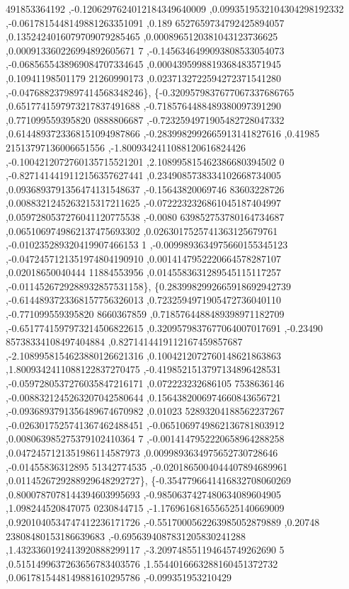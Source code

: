 \begin{DoxyCode}
      491853364192 ,-0.1206297624012184349640009 ,0.0993519532104304298192332 ,-0.0617815448149881263351091 ,0.189
      6527659734792425894057 ,0.1352424016079709079285465 ,0.0008965120381043123736625 ,0.000913360226994892605671
      7 ,-0.1456346499093808533054073 ,-0.0685655438969084707334645 ,0.0004395998819368483571945 ,0.10941198501179
      21260990173 ,0.0237132722594272371541280 ,-0.0476882379897414568348246\},
\{-0.3209579837677067337686765 ,0.6517741597973217837491688 ,-0.7185764488489380097391290 ,0.771099559395820
      0888806687 ,-0.7232594971905482728047332 ,0.6144893723368151094987866 ,-0.2839982992665913141827616 ,0.41985
      21513797136006651556 ,-1.8009342411088120616824426 ,-0.1004212072760135715521201 ,2.108995815462386680394502
      0 ,-0.8271414419112156357627441 ,0.2349085738334102668734005 ,0.0936893791356474131548637 ,-0.15643820069746
      83603228726 ,0.0088321245263215317211625 ,-0.0722232326861045187404997 ,0.0597280537276041120775538 ,-0.0080
      639852753780164734687 ,0.0651069749862137475693302 ,0.0263017525741363125679761 ,-0.010235289320419907466153
      1 ,-0.0099893634975660155345123 ,-0.0472457121351974804190910 ,0.0014147952220664578287107 ,0.02018650040444
      11884553956 ,0.0145583631289545115117257 ,-0.0114526729288932857531158\},
\{0.2839982992665918692942739 ,-0.6144893723368157756326013 ,0.7232594971905472736040110 ,-0.771099559395820
      8660367859 ,0.7185764488489398971182709 ,-0.6517741597973214506822615 ,0.3209579837677064007017691 ,-0.23490
      85738334108497404884 ,0.8271414419112167459857687 ,-2.1089958154623880126621316 ,0.1004212072760148621863863
       ,1.8009342411088122837270475 ,-0.4198521513797134896428531 ,-0.0597280537276035847216171 ,0.072223232686105
      7538636146 ,-0.0088321245263207042580644 ,0.1564382006974660843656721 ,-0.0936893791356489674670982 ,0.01023
      52893204188562237267 ,-0.0263017525741367462488451 ,-0.0651069749862136781803912 ,0.008063985275379102410364
      7 ,-0.0014147952220658964288258 ,0.0472457121351986114587973 ,0.0099893634975652730728646 ,-0.01455836312895
      51342774535 ,-0.0201865004044407894689961 ,0.0114526729288929648292727\},
\{-0.3547796641416832708060269 ,0.8000787078144394603995693 ,-0.9850637427480634089604905 ,1.098244520847075
      0230844715 ,-1.1769616816556525140669009 ,0.9201040534747412236171726 ,-0.5517000562263985052879889 ,0.20748
      23808480153186639683 ,-0.6956394087831205830241288 ,1.4323360192413920888299117 ,-3.209748551194645749262690
      5 ,0.5151499637263656783403576 ,1.5544016663288160451372732 ,0.0617815448149881610295786 ,-0.099351953210429

\end{DoxyCode}
